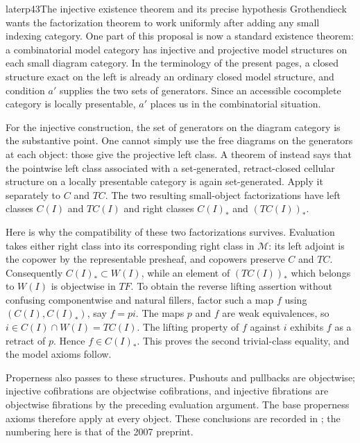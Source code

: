 \noindent{}

\begin{dcomment}{later}{p43}{The injective existence theorem and its precise hypothesis}
Grothendieck wants the factorization theorem to work uniformly after adding any small indexing category. One part of this proposal is now a standard existence theorem: a combinatorial model category has injective and projective model structures on each small diagram category. In the terminology of the present pages, a closed structure exact on the left is already an ordinary closed model structure, and condition $a'$ supplies the two sets of generators. Since an accessible cocomplete category is locally presentable, $a'$ places us in the combinatorial situation.

For the injective construction, the set of generators on the diagram category is the substantive point. One cannot simply use the free diagrams on the generators at each object: those give the projective left class. A theorem of \citet[Corollary~3.4, author preprint of 21 November 2013]{MakkaiRosicky2014Cellular} instead says that the pointwise left class associated with a set-generated, retract-closed cellular structure on a locally presentable category is again set-generated. Apply it separately to $C$ and $TC$. The two resulting small-object factorizations have left classes $C(I)$ and $TC(I)$ and right classes $C(I)_*$ and $(TC(I))_*$.

Here is why the compatibility of these two factorizations survives. Evaluation takes either right class into its corresponding right class in $\mathcal M$: its left adjoint is the copower by the representable presheaf, and copowers preserve $C$ and $TC$. Consequently $C(I)_*\subset W(I)$, while an element of $(TC(I))_*$ which belongs to $W(I)$ is objectwise in $TF$. To obtain the reverse lifting assertion without confusing componentwise and natural fillers, factor such a map $f$ using $(C(I),C(I)_*)$, say $f=pi$. The maps $p$ and $f$ are weak equivalences, so $i\in C(I)\cap W(I)=TC(I)$. The lifting property of $f$ against $i$ exhibits $f$ as a retract of $p$. Hence $f\in C(I)_*$. This proves the second trivial-class equality, and the model axioms follow.

Properness also passes to these structures. Pushouts and pullbacks are objectwise; injective cofibrations are objectwise cofibrations, and injective fibrations are objectwise fibrations by the preceding evaluation argument. The base properness axioms therefore apply at every object. These conclusions are recorded in \citet[Theorems~1.17 and 1.19, Propositions~1.21--1.22]{Barwick2007}; the numbering here is that of the 2007 preprint.


\end{dcomment}
